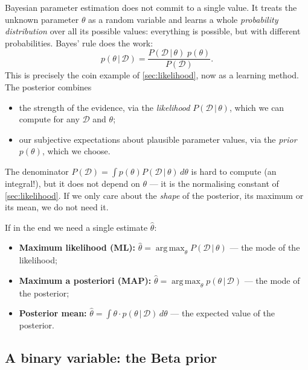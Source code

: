 \documentclass[11pt, oneside]{book}
\newcommand{\Prob}{\mathbb{P}}           %
\newcommand{\argmax}{\operatorname*{arg\,max}}
\newcommand{\dataset}{\mathcal{D}}       %
\newcommand{\given}{\,\vert\,}           %
\let\originalsubsection\subsection
\renewcommand{\subsection}{\Needspace{6\baselineskip}\originalsubsection}
\begin{document}
Bayesian parameter estimation does not commit to a single value. It treats the
unknown parameter $\theta$ as a random variable and learns a whole
\emph{probability distribution} over all its possible values: everything is
possible, but with different probabilities. Bayes' rule does the work:
\[
p(\theta \given \dataset) = \frac{P(\dataset \given \theta)\; p(\theta)}{P(\dataset)} .
\]
This is precisely the coin example of \cref{sec:likelihood}, now as a learning
method. The posterior combines
\begin{itemize}
  \item the strength of the evidence, via the \emph{likelihood} $P(\dataset
    \given \theta)$, which we can compute for any $\dataset$ and $\theta$;
  \item our subjective expectations about plausible parameter values, via the
    \emph{prior} $p(\theta)$, which we choose.
\end{itemize}
The denominator $P(\dataset) = \int p(\theta) P(\dataset \given \theta)\,
d\theta$ is hard to compute (an integral!), but it does not depend on
$\theta$ --- it is the normalising constant of \cref{sec:likelihood}. If we only
care about the \emph{shape} of the posterior, its maximum or its mean, we do not
need it.

\begin{defbox}[title={Three ways to pick one number}]
If in the end we need a single estimate $\hat\theta$:
\begin{itemize}
  \item \textbf{Maximum likelihood (ML):} $\hat\theta = \argmax_\theta P(\dataset \given \theta)$ --- the mode of the likelihood;
  \item \textbf{Maximum a posteriori (MAP):} $\hat\theta = \argmax_\theta p(\theta \given \dataset)$ --- the mode of the posterior;
  \item \textbf{Posterior mean:} $\hat\theta = \int \theta \cdot p(\theta \given \dataset)\, d\theta$ --- the expected value of the posterior.
\end{itemize}
\end{defbox}

\subsection{A binary variable: the Beta prior}
\end{document}
